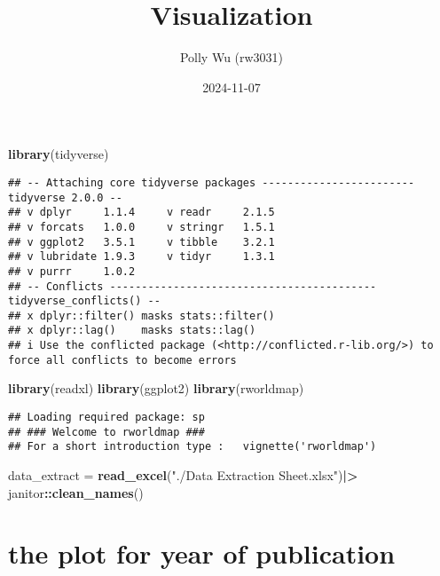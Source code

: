\documentclass[
]{article}
\title{Visualization}
\author{Polly Wu (rw3031)}
\date{2024-11-07}
\newenvironment{Shaded}{\begin{snugshade}}{\end{snugshade}}
\newcommand{\FunctionTok}[1]{\textcolor[rgb]{0.13,0.29,0.53}{\textbf{#1}}}
\newcommand{\NormalTok}[1]{#1}
\newcommand{\OtherTok}[1]{\textcolor[rgb]{0.56,0.35,0.01}{#1}}
\newcommand{\SpecialCharTok}[1]{\textcolor[rgb]{0.81,0.36,0.00}{\textbf{#1}}}
\newcommand{\StringTok}[1]{\textcolor[rgb]{0.31,0.60,0.02}{#1}}
\begin{document}
\maketitle

\begin{Shaded}
\begin{Highlighting}[]
\FunctionTok{library}\NormalTok{(tidyverse)}
\end{Highlighting}
\end{Shaded}

\begin{verbatim}
## -- Attaching core tidyverse packages ------------------------ tidyverse 2.0.0 --
## v dplyr     1.1.4     v readr     2.1.5
## v forcats   1.0.0     v stringr   1.5.1
## v ggplot2   3.5.1     v tibble    3.2.1
## v lubridate 1.9.3     v tidyr     1.3.1
## v purrr     1.0.2     
## -- Conflicts ------------------------------------------ tidyverse_conflicts() --
## x dplyr::filter() masks stats::filter()
## x dplyr::lag()    masks stats::lag()
## i Use the conflicted package (<http://conflicted.r-lib.org/>) to force all conflicts to become errors
\end{verbatim}

\begin{Shaded}
\begin{Highlighting}[]
\FunctionTok{library}\NormalTok{(readxl)}
\FunctionTok{library}\NormalTok{(ggplot2)}
\FunctionTok{library}\NormalTok{(rworldmap)}
\end{Highlighting}
\end{Shaded}

\begin{verbatim}
## Loading required package: sp
## ### Welcome to rworldmap ###
## For a short introduction type :   vignette('rworldmap')
\end{verbatim}

\begin{Shaded}
\begin{Highlighting}[]
\NormalTok{data\_extract }\OtherTok{=} 
  \FunctionTok{read\_excel}\NormalTok{(}\StringTok{"./Data Extraction Sheet.xlsx"}\NormalTok{)}\SpecialCharTok{|\textgreater{}}
\NormalTok{  janitor}\SpecialCharTok{::}\FunctionTok{clean\_names}\NormalTok{()}
\end{Highlighting}
\end{Shaded}

\section{the plot for year of
publication}\label{the-plot-for-year-of-publication}
\end{document}
